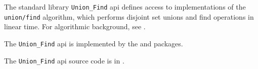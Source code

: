 
The standard library {\tt Union\_Find} api defines access to implementations of the 
{\tt union/find} algorithm, which performs disjoint set unions and find operations 
in linear time.    For algorithmic background, see .

The {\tt Union\_Find} api is implemented by the  
and   packages.

The {\tt Union\_Find} api source code is in .

